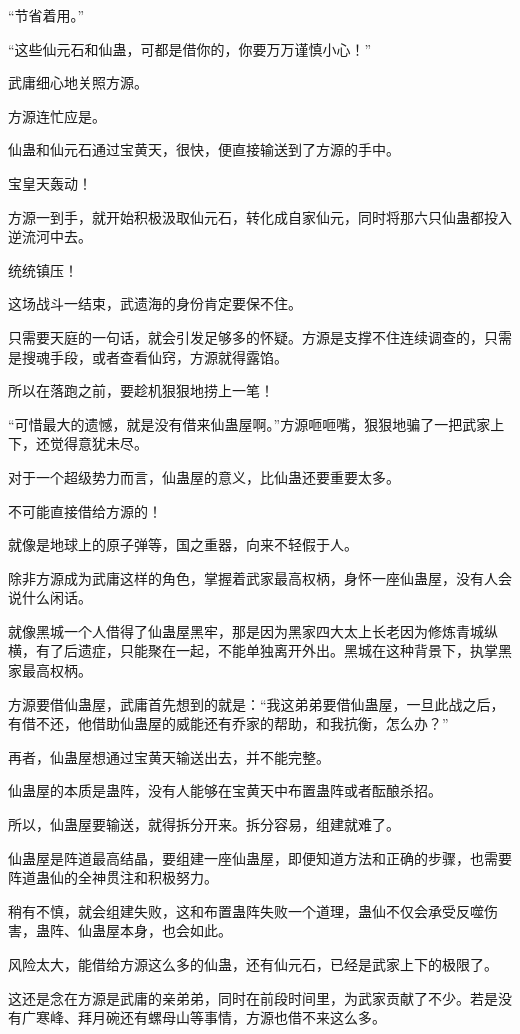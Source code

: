 \begin{this_body}
“节省着用。”

“这些仙元石和仙蛊，可都是借你的，你要万万谨慎小心！”

武庸细心地关照方源。

方源连忙应是。

仙蛊和仙元石通过宝黄天，很快，便直接输送到了方源的手中。

宝皇天轰动！

方源一到手，就开始积极汲取仙元石，转化成自家仙元，同时将那六只仙蛊都投入逆流河中去。

统统镇压！

这场战斗一结束，武遗海的身份肯定要保不住。

只需要天庭的一句话，就会引发足够多的怀疑。方源是支撑不住连续调查的，只需是搜魂手段，或者查看仙窍，方源就得露馅。

所以在落跑之前，要趁机狠狠地捞上一笔！

“可惜最大的遗憾，就是没有借来仙蛊屋啊。”方源咂咂嘴，狠狠地骗了一把武家上下，还觉得意犹未尽。

对于一个超级势力而言，仙蛊屋的意义，比仙蛊还要重要太多。

不可能直接借给方源的！

就像是地球上的原子弹等，国之重器，向来不轻假于人。

除非方源成为武庸这样的角色，掌握着武家最高权柄，身怀一座仙蛊屋，没有人会说什么闲话。

就像黑城一个人借得了仙蛊屋黑牢，那是因为黑家四大太上长老因为修炼青城纵横，有了后遗症，只能聚在一起，不能单独离开外出。黑城在这种背景下，执掌黑家最高权柄。

方源要借仙蛊屋，武庸首先想到的就是：“我这弟弟要借仙蛊屋，一旦此战之后，有借不还，他借助仙蛊屋的威能还有乔家的帮助，和我抗衡，怎么办？”

再者，仙蛊屋想通过宝黄天输送出去，并不能完整。

仙蛊屋的本质是蛊阵，没有人能够在宝黄天中布置蛊阵或者酝酿杀招。

所以，仙蛊屋要输送，就得拆分开来。拆分容易，组建就难了。

仙蛊屋是阵道最高结晶，要组建一座仙蛊屋，即便知道方法和正确的步骤，也需要阵道蛊仙的全神贯注和积极努力。

稍有不慎，就会组建失败，这和布置蛊阵失败一个道理，蛊仙不仅会承受反噬伤害，蛊阵、仙蛊屋本身，也会如此。

风险太大，能借给方源这么多的仙蛊，还有仙元石，已经是武家上下的极限了。

这还是念在方源是武庸的亲弟弟，同时在前段时间里，为武家贡献了不少。若是没有广寒峰、拜月碗还有螺母山等事情，方源也借不来这么多。


\end{this_body}
